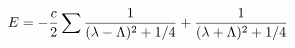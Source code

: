 \begin{equation}
E=-{c\over 2} \sum {1\over (\lambda-\Lambda)^2+1/4}+{1\over
  (\lambda+\Lambda)^2+1/4}
\end{equation}

